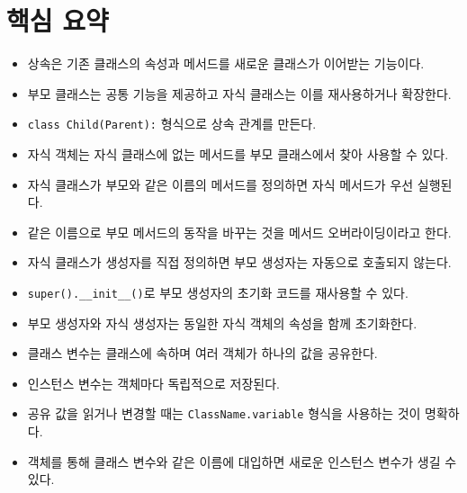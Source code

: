 \documentclass[11pt,a4paper]{article}
\begin{document}
\section{핵심 요약}

\begin{itemize}[leftmargin=1.5em]
    \item 상속은 기존 클래스의 속성과 메서드를 새로운 클래스가 이어받는 기능이다.
    \item 부모 클래스는 공통 기능을 제공하고 자식 클래스는 이를 재사용하거나 확장한다.
    \item \texttt{class Child(Parent):} 형식으로 상속 관계를 만든다.
    \item 자식 객체는 자식 클래스에 없는 메서드를 부모 클래스에서 찾아 사용할 수 있다.
    \item 자식 클래스가 부모와 같은 이름의 메서드를 정의하면 자식 메서드가 우선 실행된다.
    \item 같은 이름으로 부모 메서드의 동작을 바꾸는 것을 메서드 오버라이딩이라고 한다.
    \item 자식 클래스가 생성자를 직접 정의하면 부모 생성자는 자동으로 호출되지 않는다.
    \item \texttt{super().\_\_init\_\_()}로 부모 생성자의 초기화 코드를 재사용할 수 있다.
    \item 부모 생성자와 자식 생성자는 동일한 자식 객체의 속성을 함께 초기화한다.
    \item 클래스 변수는 클래스에 속하며 여러 객체가 하나의 값을 공유한다.
    \item 인스턴스 변수는 객체마다 독립적으로 저장된다.
    \item 공유 값을 읽거나 변경할 때는 \texttt{ClassName.variable} 형식을 사용하는 것이 명확하다.
    \item 객체를 통해 클래스 변수와 같은 이름에 대입하면 새로운 인스턴스 변수가 생길 수 있다.
\end{itemize}
\end{document}
